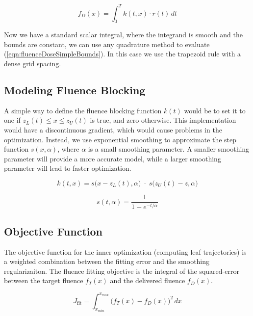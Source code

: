 \begin{equation}
  f_D(x) = \int_0^T \! k(t, x) \cdot r(t) \, dt
  \label{eqn:fluenceDoseSimpleBounds}
\end{equation}

Now we have a standard scalar integral, where the integrand is smooth and the
bounds are constant, we can use any quadrature method to evaluate (\ref{eqn:fluenceDoseSimpleBounds}).
In this case we use the trapezoid rule with a dense grid spacing.

\subsection{Modeling Fluence Blocking}
\label{sec:modelingFluenceBlocking}

A simple way to define the fluence blocking function $k(t)$
would be to set it to one if $z_L(t) \leq x \leq z_U(t)$
is true, and zero otherwise.
This implementation would have a discontinuous gradient, which would cause problems in the optimization.
Instead, we use exponential smoothing to approximate the step function $s(x,\alpha)$,
where $\alpha$ is a small smoothing parameter.
A smaller smoothing parameter will provide a more accurate model,
while a larger smoothing parameter will lead to faster optimization.

\begin{equation}
  k(t, x) = s\big(x - z_L(t), \alpha\big) \; \cdot \; s\big(z_U(t) - z, \alpha\big)
\end{equation}

\begin{equation}
  s(t, \alpha) = \frac{1}{1 + e^{-t/\alpha}}
\end{equation}

\subsection{Objective Function}

The objective function for the inner optimization (computing leaf trajectories)
is a weighted combination between the fitting error and the smoothing regularizaiton.
The fluence fitting objective is the integral of the squared-error
between the target fluence $f_T(x)$ and the delivered fluence $f_D(x)$.

\begin{equation}
  J_\text{fit} = \int_{x_{min}}^{x_{max}} \! \big( f_T(x) - f_D(x) \big)^2 \,dx
\end{equation}

